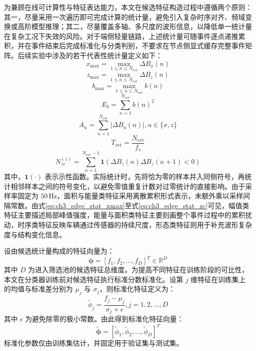 \documentclass{xdupgthesis}
\begin{document}
为兼顾在线可计算性与特征表达能力，本文在候选特征构造过程中遵循两个原则：其一，尽量采用一次遍历即可完成计算的统计量，避免引入复杂时序对齐、频域变换或高阶模型推理；其二，尽量覆盖多轴、多尺度的波形信息，以降低单一统计量在复杂工况下失效的风险。对于端侧轻量链路，上述统计量可随事件逐点递推累积，并在事件结束后完成标准化与分类判别，不要求在节点侧显式缓存完整事件矩阵。后续实验中涉及的若干代表性统计量定义如下：
\begin{equation}
\label{eq:ch3_edge_stat_xmax}
    x_{\max}=\max_{1\le n\le N_{\mathrm{evt}}}\Delta B_x(n)
\end{equation}
\begin{equation}
\label{eq:ch3_edge_stat_zmax}
    z_{\max}=\max_{1\le n\le N_{\mathrm{evt}}}\Delta B_z(n)
\end{equation}
\begin{equation}
    b_{\max}=\max_{1\le n\le N_{\mathrm{evt}}} b(n)
\end{equation}
\begin{equation}
\label{eq:ch3_edge_stat_eb}
    E_b=\sum_{n=1}^{N_{\mathrm{evt}}} b(n)^2
\end{equation}
\begin{equation}
\label{eq:ch3_edge_stat_au}
    A_u=\sum_{n=1}^{N_{\mathrm{evt}}}\left|\Delta B_u(n)\right|, u\in\{x,z\}
\end{equation}
\begin{equation}
    T_{\mathrm{evt}}=\frac{N_{\mathrm{evt}}}{f_s}
\end{equation}
\begin{equation}
\label{eq:ch3_edge_stat_zc}
    N_{zc}^{(z)}=
    \sum_{n=1}^{N_{\mathrm{evt}}-1}
    \mathbf{1}\!\left(\Delta B_z(n)\Delta B_z(n+1)<0\right)
\end{equation}
其中，$\mathbf{1}(\cdot)$ 表示示性函数。实际统计时，先将恰为零的样本并入同侧符号，再统计相邻样本之间的符号变化，以避免零值重复计数对过零统计的直接影响。由于采样率固定为 $50\,\mathrm{Hz}$，面积与能量类特征采用离散累积形式表示，未额外乘以采样间隔常数。由式\eqref{eq:ch3_edge_stat_xmax}至式\eqref{eq:ch3_edge_stat_zc}可见，幅值类特征主要描述局部峰值强度，能量与面积类特征主要刻画整个事件过程中的累积扰动，时序类特征反映车辆通过传感器的持续尺度，形态类特征则用于补充波形复杂度与结构变化信息。

设由候选统计量构成的特征向量为：
\begin{equation}
\label{eq:ch3_edge_feat_vector}
    \boldsymbol{\phi}=[f_1,f_2,\ldots,f_D]^T\in\mathbb{R}^{D}
\end{equation}
其中 $D$ 为进入筛选池的候选特征总维度。为提高不同特征在训练阶段的可比性，本文在分类器训练前对候选特征执行标准分数标准化。设第 $j$ 维特征在训练集上的均值与标准差分别为 $\mu_j$ 与 $\sigma_j$，则标准化特征定义为：
\begin{equation}
\label{eq:ch3_edge_feat_norm}
    \tilde{\phi}_j=\frac{f_j-\mu_j}{\sigma_j+\epsilon}, j=1,2,\ldots,D
\end{equation}
其中 $\epsilon$ 为避免除零的极小常数。由此得到标准化特征向量：
\begin{equation}
\label{eq:ch3_edge_feat_norm_vec}
    \tilde{\boldsymbol{\phi}}=[\tilde{\phi}_1,\tilde{\phi}_2,\ldots,\tilde{\phi}_D]^T
\end{equation}
标准化参数仅由训练集估计，并固定用于验证集与测试集。
\end{document}
